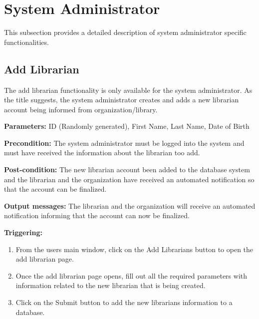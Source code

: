 \section{System Administrator}
\label{operation:System Administrator}

This subsection provides a detailed description of system administrator specific functionalities.

\subsection{Add Librarian}

The add librarian functionality is only available for the system administrator. As the title suggests, the system administrator creates and adds a new librarian account being informed from organization/library. 

\begin{description}

\item \textbf{Parameters:} ID (Randomly generated), First Name, Last Name, Date of Birth

\item \textbf{Precondition:} The system administrator must be logged into the system and must have received the information about the librarian too add. 

\item \textbf{Post-condition:} The new librarian account been added to the database system and the librarian and the organization have received an automated notification so that the account can be finalized. 

\item \textbf{Output messages:} The librarian and the organization will receive an automated notification informing that the account can now be finalized. 

\item \textbf{Triggering:}
\begin{enumerate}
\item From the users main window, click on the Add Librarians button to open the add librarian page. 

\item Once the add librarian page opens, fill out all the required parameters with information related to the new librarian that is being created. 

\item Click on the Submit button to add the new librarians information to a database. 

\end{enumerate}

\end{description}

